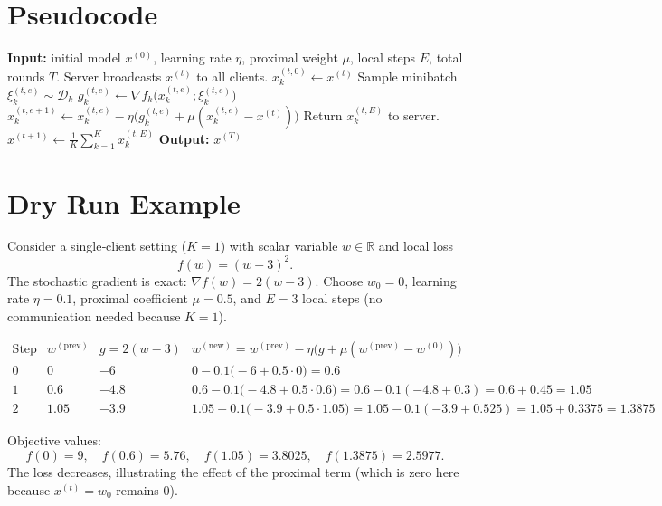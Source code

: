 \documentclass[11pt]{article}
\newcommand{\R}{\mathbb{R}}
\begin{document}
\section*{Pseudocode}
\begin{algorithm}[H]
\caption{FedProx}
\begin{algorithmic}[1]
\State \textbf{Input:} initial model $x^{(0)}$, learning rate $\eta$, proximal weight $\mu$, local steps $E$, total rounds $T$.
    \State Server broadcasts $x^{(t)}$ to all clients.
        \State $x_{k}^{(t,0)} \gets x^{(t)}$
            \State Sample minibatch $\xi_{k}^{(t,e)}\sim\mathcal D_k$
            \State $g_{k}^{(t,e)} \gets \nabla f_k\!\bigl(x_{k}^{(t,e)};\xi_{k}^{(t,e)}\bigr)$
            \State $x_{k}^{(t,e+1)} \gets x_{k}^{(t,e)} - \eta\bigl(g_{k}^{(t,e)}+\mu(x_{k}^{(t,e)}-x^{(t)})\bigr)$
        \EndFor
        \State Return $x_{k}^{(t,E)}$ to server.
    \EndFor
    \State $x^{(t+1)} \gets \frac{1}{K}\sum_{k=1}^{K} x_{k}^{(t,E)}$   
\EndFor
\State \textbf{Output:} $x^{(T)}$
\end{algorithmic}
\end{algorithm}

\section*{Dry Run Example}
Consider a single‑client setting ($K=1$) with scalar variable $w\in\R$ and local loss
\[
f(w)= (w-3)^2 .
\]
The stochastic gradient is exact: $\nabla f(w)=2(w-3)$.  
Choose $w_0=0$, learning rate $\eta=0.1$, proximal coefficient $\mu=0.5$, and $E=3$ local steps (no communication needed because $K=1$).

\[
\begin{array}{c|c|c|c}
\text{Step} & w^{(\text{prev})} & \displaystyle g=2(w-3) & w^{(\text{new})}= w^{(\text{prev})} -\eta\bigl(g+\mu(w^{(\text{prev})}-w^{(0)})\bigr)\\ \hline
0 & 0 & -6 & 0 -0.1\bigl(-6+0.5\cdot0\bigr)=0.6\\
1 & 0.6 & -4.8 & 0.6-0.1\bigl(-4.8+0.5\cdot0.6\bigr)=0.6-0.1(-4.8+0.3)=0.6+0.45=1.05\\
2 & 1.05 & -3.9 & 1.05-0.1\bigl(-3.9+0.5\cdot1.05\bigr)=1.05-0.1(-3.9+0.525)=1.05+0.3375=1.3875
\end{array}
\]

Objective values:
\[
f(0)=9,\quad f(0.6)=5.76,\quad f(1.05)=3.8025,\quad f(1.3875)=2.5977.
\]
The loss decreases, illustrating the effect of the proximal term (which is zero here because $x^{(t)}=w_0$ remains $0$).
\end{document}
